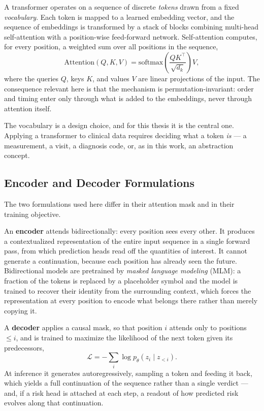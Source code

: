 A transformer \citep{attention-is-all-you-need} operates on a sequence of discrete \emph{tokens} drawn from a fixed \emph{vocabulary}. Each token is mapped to a learned embedding vector, and the sequence of embeddings is transformed by a stack of blocks combining multi-head self-attention with a position-wise feed-forward network. Self-attention computes, for every position, a weighted sum over all positions in the sequence,
\[
\mathrm{Attention}(Q,K,V) = \mathrm{softmax}\!\left(\frac{QK^{\top}}{\sqrt{d_k}}\right)V ,
\]
where the queries $Q$, keys $K$, and values $V$ are linear projections of the input. The consequence relevant here is that the mechanism is permutation-invariant: order and timing enter only through what is added to the embeddings, never through attention itself.

The vocabulary is a design choice, and for this thesis it is the central one. Applying a transformer to clinical data requires deciding what a token \emph{is} --- a measurement, a visit, a diagnosis code, or, as in this work, an abstraction concept.

\subsection{Encoder and Decoder Formulations}

The two formulations used here differ in their attention mask and in their training objective.

An \textbf{encoder} \citep{bert-pre-training-deep-bidirectional-transformers-language-understanding} attends bidirectionally: every position sees every other. It produces a contextualized representation of the entire input sequence in a single forward pass, from which prediction heads read off the quantities of interest. It cannot generate a continuation, because each position has already seen the future. Bidirectional models are pretrained by \emph{masked language modeling} (MLM): a fraction of the tokens is replaced by a placeholder symbol and the model is trained to recover their identity from the surrounding context, which forces the representation at every position to encode what belongs there rather than merely copying it.

A \textbf{decoder} \citep{language-models-are-unsupervised-multitask-learners} applies a causal mask, so that position $i$ attends only to positions $\le i$, and is trained to maximize the likelihood of the next token given its predecessors,
\[
\mathcal{L} = -\sum_{i} \log p_\theta(z_i \mid z_{<i}).
\]
At inference it generates autoregressively, sampling a token and feeding it back, which yields a full continuation of the sequence rather than a single verdict --- and, if a risk head is attached at each step, a readout of how predicted risk evolves along that continuation.

